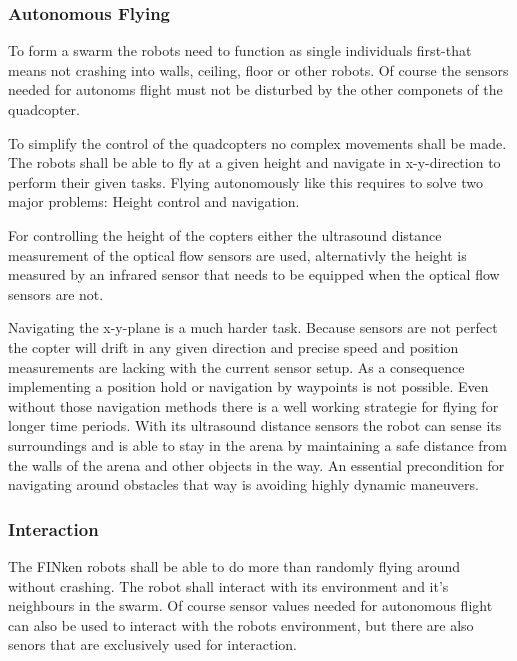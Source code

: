 \subsubsection{Autonomous Flying}
To form a swarm the robots need to function as single individuals first-that means not crashing into walls, ceiling, floor or other robots.
Of course the sensors needed for autonoms flight must not be disturbed by the other componets of the quadcopter.

To simplify the control of the quadcopters no complex movements shall be made.
The robots shall be able to fly at a given height and navigate in x-y-direction to perform their given tasks.
Flying autonomously like this requires to solve two major problems: Height control and navigation.

For controlling the height of the copters either the ultrasound distance measurement of the optical flow sensors are used, alternativly the height is measured by an infrared sensor that needs to be equipped when the optical flow sensors are not.


Navigating the x-y-plane is a much harder task.
Because sensors are not perfect the copter will drift in any given direction and precise speed and position measurements are lacking with the current sensor setup.
As a consequence implementing a position hold or navigation by waypoints is not possible.
Even without those navigation methods there is a well working strategie for flying for longer time periods.
With its ultrasound distance sensors the robot can sense its surroundings and is able to stay in the arena by maintaining a safe distance from the walls of the arena and other objects in the way. 
An essential precondition for navigating around obstacles that way is avoiding highly dynamic maneuvers.

\subsubsection{Interaction}

The FINken robots shall be able to do more than randomly flying around without crashing.
The robot shall interact with its environment and it's neighbours in the swarm.
Of course sensor values needed for autonomous flight can also be used to interact with the robots environment, but there are also senors that are exclusively used for interaction.

